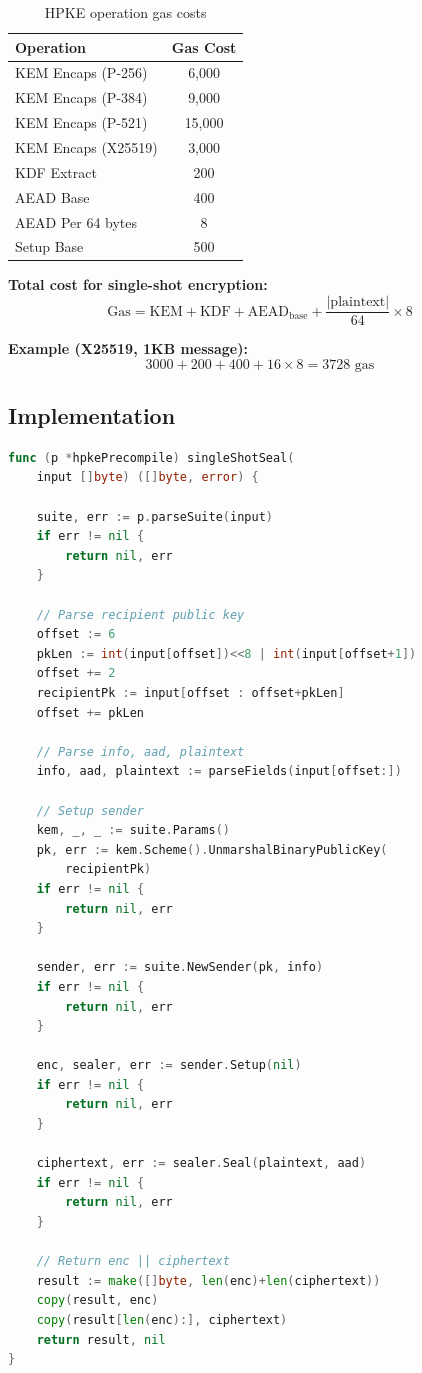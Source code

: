 \documentclass[11pt,a4paper]{article}
\theoremstyle{definition}
\begin{document}
\begin{table}[h]
\centering
\begin{tabular}{lc}
\toprule
Operation & Gas Cost \\
\midrule
KEM Encaps (P-256) & 6,000 \\
KEM Encaps (P-384) & 9,000 \\
KEM Encaps (P-521) & 15,000 \\
KEM Encaps (X25519) & 3,000 \\
KDF Extract & 200 \\
AEAD Base & 400 \\
AEAD Per 64 bytes & 8 \\
Setup Base & 500 \\
\bottomrule
\end{tabular}
\caption{HPKE operation gas costs}
\end{table}

\textbf{Total cost for single-shot encryption:}
\[
\text{Gas} = \text{KEM} + \text{KDF} + \text{AEAD}_{\text{base}} + \frac{|\text{plaintext}|}{64} \times 8
\]

\textbf{Example (X25519, 1KB message):}
\[
3000 + 200 + 400 + 16 \times 8 = 3728 \text{ gas}
\]

\subsection{Implementation}

\begin{lstlisting}[language=Go]
func (p *hpkePrecompile) singleShotSeal(
    input []byte) ([]byte, error) {

    suite, err := p.parseSuite(input)
    if err != nil {
        return nil, err
    }

    // Parse recipient public key
    offset := 6
    pkLen := int(input[offset])<<8 | int(input[offset+1])
    offset += 2
    recipientPk := input[offset : offset+pkLen]
    offset += pkLen

    // Parse info, aad, plaintext
    info, aad, plaintext := parseFields(input[offset:])

    // Setup sender
    kem, _, _ := suite.Params()
    pk, err := kem.Scheme().UnmarshalBinaryPublicKey(
        recipientPk)
    if err != nil {
        return nil, err
    }

    sender, err := suite.NewSender(pk, info)
    if err != nil {
        return nil, err
    }

    enc, sealer, err := sender.Setup(nil)
    if err != nil {
        return nil, err
    }

    ciphertext, err := sealer.Seal(plaintext, aad)
    if err != nil {
        return nil, err
    }

    // Return enc || ciphertext
    result := make([]byte, len(enc)+len(ciphertext))
    copy(result, enc)
    copy(result[len(enc):], ciphertext)
    return result, nil
}
\end{lstlisting}
\end{document}
